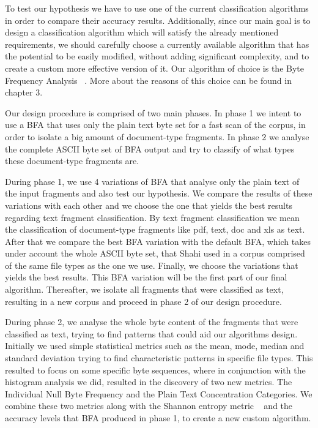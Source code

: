 To test our hypothesis we have to use one of the current classification algorithms in order to compare their accuracy results. Additionally, since our main goal is to design a classification algorithm  which will satisfy the already mentioned requirements, we should carefully choose a currently available algorithm that has the potential to be easily modified, without adding significant complexity, and to create a custom more effective version of it. Our algorithm of choice is the Byte Frequency Analysis ~\cite{MacDaniel}. More about the reasons of this choice can be found in chapter 3.

Our design procedure is comprised of two main phases. In phase 1 we intent to use a BFA that uses only the plain text byte set for a fast scan of the corpus, in order to isolate a big amount of document-type fragments. In phase 2 we analyse the complete ASCII byte set of BFA output and try to classify of what types these document-type fragments are.


During phase 1, we use 4 variations of BFA that analyse only the plain text of the input fragments and also test our hypothesis. We compare the results of these variations with each other and we choose the one that yields the best results regarding text fragment classification. By text fragment classification we mean the classification of document-type fragments like pdf, text, doc and xls as text. After that we compare the best BFA variation  with the default BFA, which takes under account the whole ASCII byte set, that Shahi \cite{Ashim} used in a corpus comprised of the same file types as the one we use. Finally, we choose the variations that yields the best results. This BFA variation will be the first part of our final algorithm. Thereafter, we isolate all fragments that were classified as text, resulting in a new corpus and proceed in phase 2 of our design procedure.

During phase 2, we analyse the whole byte content of the fragments that were classified as text, trying to find patterns that could aid our algorithms design. Initially we used simple statistical metrics such as the mean, mode, median and standard deviation trying to find characteristic patterns in specific file types. This resulted to focus on some specific byte sequences, where in conjunction with the histogram analysis we did, resulted in the discovery of two new metrics. The Individual Null Byte Frequency and the Plain Text Concentration Categories. We combine these two metrics along with the Shannon entropy metric ~\cite{Shannon} and the accuracy levels that BFA produced in phase 1, to create a new custom algorithm.




 


